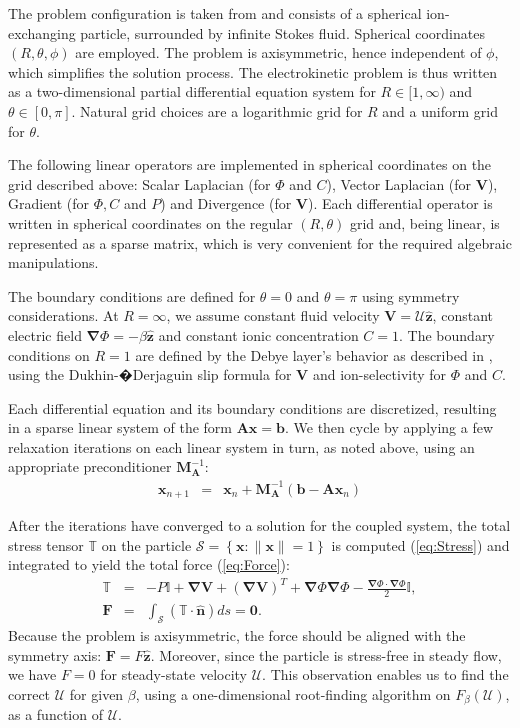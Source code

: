 \documentclass[12pt]{article}
\newcommand{\cl}[1]{\ensuremath{\mathcal{#1}}}
\newcommand{\vect}[1]{\ensuremath{\mathbf{#1}}}
\newcommand{\matr}[1]{\ensuremath{\mathbf{#1}}}
\providecommand\bnabla{\boldsymbol{\nabla}}
\providecommand\bV{\boldsymbol{V}}
\providecommand\bx{\boldsymbol{x}}
\providecommand\bzhat{\hat{\boldsymbol{z}}}
\providecommand\bnhat{\hat{\boldsymbol{n}}}
\begin{document}
The problem configuration is taken from \cite{yariv2010migration} and
consists of a spherical ion-exchanging particle, surrounded by
infinite Stokes fluid. Spherical coordinates $(R,\theta,\phi)$ are
employed. The problem is axisymmetric, hence independent of
$\phi$, which simplifies the solution process. The electrokinetic
problem is thus written as a two-dimensional partial differential
equation system for $R \in [1,\infty)$ and $\theta \in [0, \pi]$.
Natural grid choices are a logarithmic grid for $R$ and a uniform
grid for $\theta$.

The following linear operators are implemented in spherical
coordinates on the grid described above: Scalar Laplacian (for
$\varPhi$ and $C$), Vector Laplacian (for $\bV$), Gradient (for
$\Phi, C$ and $P$) and Divergence (for $\bV$). Each differential
operator is written in spherical coordinates on the regular $(R,
\theta)$ grid and, being linear, is represented as a sparse
matrix, which is very convenient for the required algebraic
manipulations.

The boundary conditions are defined for $\theta = 0$ and $\theta =
\pi$ using symmetry considerations. At $R = \infty$, we assume
constant fluid velocity $\bV = \cl{U} \bzhat$, constant electric
field $\bnabla \varPhi = -\beta \bzhat$ and constant ionic
concentration $C = 1$. The boundary conditions on $R = 1$ are
defined by the Debye layer's behavior as described in
\cite{yariv2010migration}, using the Dukhin-�Derjaguin slip formula for
$\bV$ and ion-selectivity for $\varPhi$ and $C$.

Each differential equation and its boundary conditions are
discretized, resulting in a sparse linear system of the form
$\matr{A}\bx = \vect{b}$. We then cycle by applying a few
relaxation iterations on each linear system in turn, as noted
above, using an appropriate preconditioner
$\matr{M}_\matr{A}^{-1}$:
\begin{eqnarray} \label{eq:Relax}
  \bx_{n+1} &=& \bx_{n} + \matr{M}_\matr{A}^{-1} \left(\vect{b} - \matr{A}\bx_{n}\right)
\end{eqnarray}

After the iterations have converged to a solution for the coupled
system, the total stress tensor $\mathbb{T}$ on the particle
$\cl{S} = \left\{\bx : \|\bx\| = 1\right\}$ is computed
(\ref{eq:Stress}) and integrated to yield the total force
(\ref{eq:Force}):
\begin{eqnarray}
  \label{eq:Stress}
  \mathbb{T} &=& - P \mathbb{I} + \bnabla \bV + (\bnabla \bV) ^T  +
  \bnabla \varPhi \bnabla \varPhi - \frac{\bnabla \varPhi \cdot \bnabla \varPhi}{2} \mathbb{I}, \\
  \label{eq:Force}
  \vect{F} &=& \int_{\cl{S}} \left(\mathbb{T} \cdot \bnhat \right) ds = \boldsymbol{0}.
\end{eqnarray}
Because the problem is axisymmetric, the force should be aligned
with the symmetry axis: $\vect{F} = F \bzhat$. Moreover, since the
particle is stress-free in steady flow, we have $F = 0$ for
steady-state velocity $\cl{U}$. This observation enables us to
find the correct $\cl{U}$ for given $\beta$, using a
one-dimensional root-finding algorithm on $F_\beta(\cl{U})$, as a
function of $\cl{U}$.
\end{document}
